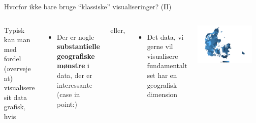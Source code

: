\documentclass[
  8pt,
  ignorenonframetext,
  aspectratio=169]{beamer}
\providecommand{\tightlist}{%
  \setlength{\itemsep}{0pt}\setlength{\parskip}{0pt}}
\newcommand{\columnsbegin}{\begin{columns}}
\newcommand{\columnsend}{\end{columns}}
\begin{document}
\begin{frame}{Hvorfor ikke bare bruge ``klassiske'' visualiseringer?
(II)}
\protect\hypertarget{hvorfor-ikke-bare-bruge-klassiske-visualiseringer-ii}{}
\columnsbegin


Typisk kan man med fordel (overveje at) visualisere sit data grafisk,
hvis

\begin{itemize}
\tightlist
\item
  Der er nogle \textbf{substantielle geografiske mønstre} i data, der er
  interessante (case in point:)
\end{itemize}

eller,

\begin{itemize}
\tightlist
\item
  Det data, vi gerne vil visualisere fundamentalt set har en geografisk
  dimension
\end{itemize}


\tiny

\includegraphics[width=1\linewidth]{crashcourse_slides_files/figure-beamer/unnamed-chunk-4-1}

\normalsize

\columnsend
\end{frame}
\end{document}
